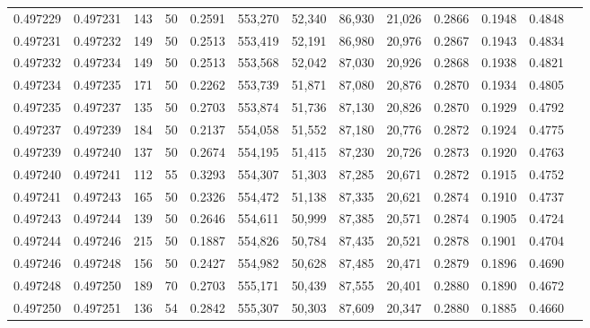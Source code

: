 \begin{tabular}{rrrrrrrrrrrrr}
0.497229 & 0.497231 &   143 &  50 &                                     0.2591 & 553,270 &  52,340 &  86,930 &  21,026 & 0.2866 & 0.1948 & 0.4848 \\
0.497231 & 0.497232 &   149 &  50 &                                     0.2513 & 553,419 &  52,191 &  86,980 &  20,976 & 0.2867 & 0.1943 & 0.4834 \\
0.497232 & 0.497234 &   149 &  50 &                                     0.2513 & 553,568 &  52,042 &  87,030 &  20,926 & 0.2868 & 0.1938 & 0.4821 \\
0.497234 & 0.497235 &   171 &  50 &                                     0.2262 & 553,739 &  51,871 &  87,080 &  20,876 & 0.2870 & 0.1934 & 0.4805 \\
0.497235 & 0.497237 &   135 &  50 &                                     0.2703 & 553,874 &  51,736 &  87,130 &  20,826 & 0.2870 & 0.1929 & 0.4792 \\
0.497237 & 0.497239 &   184 &  50 &                                     0.2137 & 554,058 &  51,552 &  87,180 &  20,776 & 0.2872 & 0.1924 & 0.4775 \\
0.497239 & 0.497240 &   137 &  50 &                                     0.2674 & 554,195 &  51,415 &  87,230 &  20,726 & 0.2873 & 0.1920 & 0.4763 \\
0.497240 & 0.497241 &   112 &  55 &                                     0.3293 & 554,307 &  51,303 &  87,285 &  20,671 & 0.2872 & 0.1915 & 0.4752 \\
0.497241 & 0.497243 &   165 &  50 &                                     0.2326 & 554,472 &  51,138 &  87,335 &  20,621 & 0.2874 & 0.1910 & 0.4737 \\
0.497243 & 0.497244 &   139 &  50 &                                     0.2646 & 554,611 &  50,999 &  87,385 &  20,571 & 0.2874 & 0.1905 & 0.4724 \\
0.497244 & 0.497246 &   215 &  50 &                                     0.1887 & 554,826 &  50,784 &  87,435 &  20,521 & 0.2878 & 0.1901 & 0.4704 \\
0.497246 & 0.497248 &   156 &  50 &                                     0.2427 & 554,982 &  50,628 &  87,485 &  20,471 & 0.2879 & 0.1896 & 0.4690 \\
0.497248 & 0.497250 &   189 &  70 &                                     0.2703 & 555,171 &  50,439 &  87,555 &  20,401 & 0.2880 & 0.1890 & 0.4672 \\
0.497250 & 0.497251 &   136 &  54 &                                     0.2842 & 555,307 &  50,303 &  87,609 &  20,347 & 0.2880 & 0.1885 & 0.4660 \\

\end{tabular}
